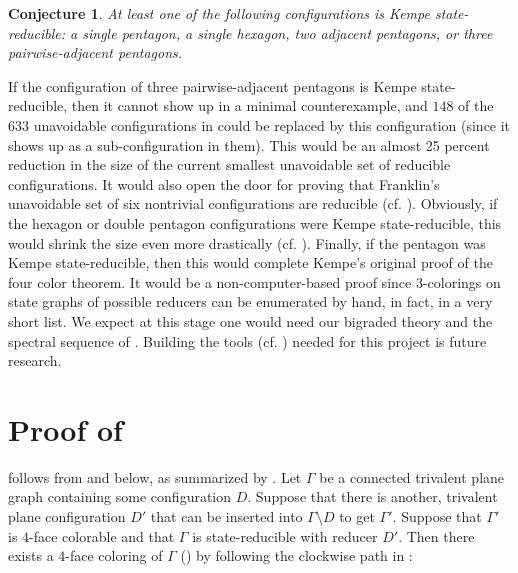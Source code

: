 \documentclass[12pt]{amsart}
\newtheorem{Conjecture}[Theorem]{Conjecture}
\theoremstyle{definition}
\theoremstyle{remark}
\numberwithin{equation}{section}
\begin{document}
\begin{Conjecture}\label{Conjecture:Kempe-state-reducible}
At least one of the following configurations is Kempe state-reducible: a single pentagon, a single hexagon, two adjacent pentagons, or three pairwise-adjacent pentagons.  
\end{Conjecture}

If the configuration of three pairwise-adjacent pentagons is Kempe state-reducible, then it cannot show up in a minimal counterexample, and $148$ of the $633$ unavoidable configurations in \cite{RSST} could be replaced by this configuration (since it shows up as a sub-configuration in them). This would be an almost 25 percent reduction in the size of the current smallest unavoidable set of reducible configurations. It would also open the door for proving that Franklin's unavoidable set of six nontrivial configurations are reducible (cf. \cite{Franklin}). Obviously, if the hexagon or double pentagon configurations were Kempe state-reducible, this would shrink the size even more drastically (cf. \cite{Wernicke}). Finally, if the pentagon was Kempe state-reducible, then this would complete Kempe's original proof of the four color theorem. It would be a non-computer-based proof since $3$-colorings on state graphs of  possible reducers can be enumerated by hand, in fact, in a very short list. We expect at this stage  one would need our bigraded theory and the spectral sequence of \cite{BMcC}. Building the tools (cf. ) needed for this project is future research.


\section{Proof of }

 follows from  and  below,  as summarized by  . Let $\Gamma$ be a connected trivalent plane graph containing some configuration $D$. Suppose that there is another,  trivalent plane configuration $D'$ that can be inserted into $\Gamma\setminus D$ to get $\Gamma'$. Suppose that $\Gamma'$ is $4$-face colorable and that $\Gamma$ is state-reducible with reducer $D'$. Then there exists a $4$-face coloring of $\Gamma$ () by following the clockwise path  in :
\end{document}
